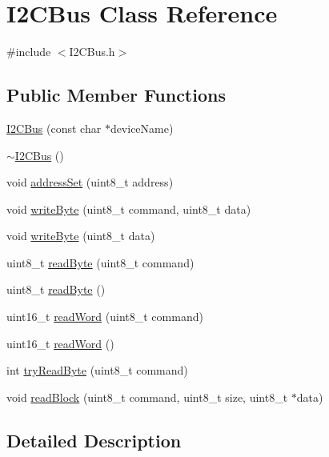 \hypertarget{class_i2_c_bus}{\section{\-I2\-C\-Bus \-Class \-Reference}
\label{class_i2_c_bus}
}


{\ttfamily \#include $<$\-I2\-C\-Bus.\-h$>$}

\subsection*{\-Public \-Member \-Functions}
\begin{DoxyCompactItemize}
\item 
\hyperlink{class_i2_c_bus_afc250c51eed417b2726c53353cae4083}{\-I2\-C\-Bus} (const char $\ast$device\-Name)
\item 
\hyperlink{class_i2_c_bus_a70dac2923cd16ce06f0e73f7fc5bca89}{$\sim$\-I2\-C\-Bus} ()
\item 
void \hyperlink{class_i2_c_bus_a3df26769808e1e948dda57cd02680c3d}{address\-Set} (uint8\-\_\-t address)
\item 
void \hyperlink{class_i2_c_bus_a0f9c9c32bff6152119b4ee79f003a1bd}{write\-Byte} (uint8\-\_\-t command, uint8\-\_\-t data)
\item 
void \hyperlink{class_i2_c_bus_a1e64669ddb6db1efda2525d51e6a99e8}{write\-Byte} (uint8\-\_\-t data)
\item 
uint8\-\_\-t \hyperlink{class_i2_c_bus_a3b7cd32f752e2a5eeb6a5bdaf9267282}{read\-Byte} (uint8\-\_\-t command)
\item 
uint8\-\_\-t \hyperlink{class_i2_c_bus_a1f9b4e6e0771e3de031aab0f8c5bc691}{read\-Byte} ()
\item 
uint16\-\_\-t \hyperlink{class_i2_c_bus_a4db730c58bf5bab95bae47c976ccd825}{read\-Word} (uint8\-\_\-t command)
\item 
uint16\-\_\-t \hyperlink{class_i2_c_bus_a09abdc7887db46a7f9a26f37754ad6d1}{read\-Word} ()
\item 
int \hyperlink{class_i2_c_bus_a9aefab7f4230de3dc45385d1c79d4fe5}{try\-Read\-Byte} (uint8\-\_\-t command)
\item 
void \hyperlink{class_i2_c_bus_a3f0bed946e8431cacbac1f214ba03232}{read\-Block} (uint8\-\_\-t command, uint8\-\_\-t size, uint8\-\_\-t $\ast$data)
\end{DoxyCompactItemize}


\subsection{\-Detailed \-Description}


